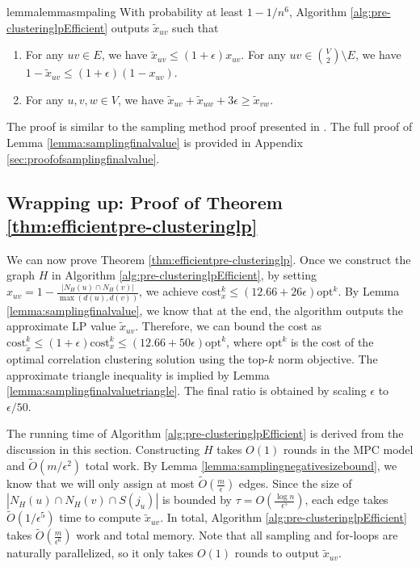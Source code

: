 \documentclass[11pt]{article}
\newcommand{\cost}{\mathrm{cost}}
\newcommand{\opt}{{\mathrm{opt}}}
\begin{document}
\begin{CJK*}{UTF8}{gbsn}
\begin{restatable}{lemma}{lemmasmpaling}
\label{lemma:samplingfinalvalue}
With probability at least $1 - 1 / n^6$, Algorithm \ref{alg:pre-clusteringlpEfficient} outputs $\tilde{x}_{uv}$ such that
\begin{enumerate}[label=(\ref{lemma:samplingfinalvalue}\alph*)]\item For any $uv \in E$, we have $\tilde{x}_{uv} \leq (1 + \epsilon) x_{uv}$. For any $uv \in {V \choose 2} \setminus E$, we have $1 - \tilde{x}_{uv} \leq (1 + \epsilon)(1 - x_{uv})$.
    \label{lemma:samplingfinalvaluelpvalue}
    \item For any $u, v, w \in V$, we have $\tilde{x}_{uv} + \tilde{x}_{uw} + 3\epsilon \geq \tilde{x}_{vw}$.
    \label{lemma:samplingfinalvaluetriangle}
\end{enumerate}
\end{restatable}

The proof is similar to the sampling method proof presented in \cite{davies2023fast}. The full proof of Lemma \ref{lemma:samplingfinalvalue} is provided in Appendix \ref{sec:proofofsamplingfinalvalue}.

\subsection{Wrapping up: Proof of Theorem \ref{thm:efficientpre-clusteringlp}}

We can now prove Theorem \ref{thm:efficientpre-clusteringlp}. Once we construct the graph $H$ in Algorithm \ref{alg:pre-clusteringlpEfficient}, by setting $x_{uv} = 1 - \frac{|N_H(u) \cap N_H(v)|}{\max(d(u), d(v))}$, we achieve $\cost^k_x \leq (12.66 + 26\epsilon) \opt^k$. By Lemma \ref{lemma:samplingfinalvalue}, we know that at the end, the algorithm outputs the approximate LP value $\tilde{x}_{uv}$. Therefore, we can bound the cost as $\cost^k_{\tilde{x}} \leq (1 + \epsilon) \cost^k_x \leq (12.66 + 50\epsilon) \opt^k$, where $\opt^k$ is the cost of the optimal correlation clustering solution using the top-$k$ norm objective. The approximate triangle inequality is implied by Lemma \ref{lemma:samplingfinalvaluetriangle}. The final ratio is obtained by scaling $\epsilon$ to $\epsilon / 50$.

The running time of Algorithm \ref{alg:pre-clusteringlpEfficient} is derived from the discussion in this section. Constructing $H$ takes $O(1)$ rounds in the MPC model and $\tilde{O}(m /\epsilon^2)$ total work. By Lemma \ref{lemma:samplingnegativesizebound}, we know that we will only assign at most $\tilde{O}(\frac{m}{\epsilon})$ edges. Since the size of $|N_H(u) \cap N_H(v) \cap S(j_u)|$ is bounded by $\tau = O(\frac{\log n}{\epsilon^5})$, each edge takes $\tilde{O}(1/\epsilon^5)$ time to compute $\tilde{x}_{uv}$. In total, Algorithm \ref{alg:pre-clusteringlpEfficient} takes $\tilde{O}(\frac{m}{\epsilon^6})$ work and total memory. Note that all sampling and for-loops are naturally parallelized, so it only takes $O(1)$ rounds to output $\tilde{x}_{uv}$.




\end{CJK*}
\end{document}
